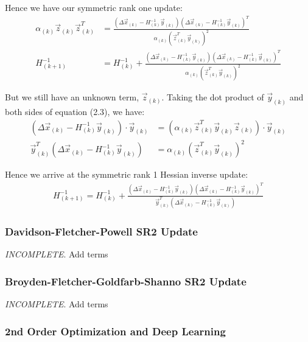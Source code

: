 \documentclass[paper=a4, fontsize=12pt]{scrartcl} %
\numberwithin{equation}{section} %
\numberwithin{figure}{section} %
\numberwithin{table}{section} %
\begin{document}
Hence we have our symmetric rank one update:
\begin{align*}
    \alpha_{(k)} \vec{z}_{(k)} \vec{z}_{(k)}^T &= \frac{\left( \Delta \vec{x}_{(k)} - H_{(k)}^{-1} \vec{y}_{(k)} \right) \left( \Delta \vec{x}_{(k)} - H_{(k)}^{-1} \vec{y}_{(k)} \right)^T}{\alpha_{(k)} (\vec{z}_{(k)}^T \vec{y}_{(k)})^2} \\
    H_{(k+1)}^{-1} &= H_{(k)}^{-1} + \frac{\left( \Delta \vec{x}_{(k)} - H_{(k)}^{-1} \vec{y}_{(k)} \right) \left( \Delta \vec{x}_{(k)} - H_{(k)}^{-1} \vec{y}_{(k)} \right)^T}{\alpha_{(k)} (\vec{z}_{(k)}^T \vec{y}_{(k)})^2}
\end{align*}

But we still have an unknown term, $\vec{z}_{(k)}$. Taking the dot product of $\vec{y}_{(k)}$ and both sides of equation (2.3), we have:
\begin{align*}
    \left( \Delta \vec{x}_{(k)} - H_{(k)}^{-1} \vec{y}_{(k)} \right) \cdot \vec{y}_{(k)} &= \left( \alpha_{(k)} \vec{z}_{(k)}^T \vec{y}_{(k)} \vec{z}_{(k)} \right) \cdot \vec{y}_{(k)} \\
    \vec{y}_{(k)}^T \left( \Delta \vec{x}_{(k)} - H_{(k)}^{-1} \vec{y}_{(k)} \right) &= \alpha_{(k)} \left( \vec{z}_{(k)}^T \vec{y}_{(k)} \right)^2
\end{align*}

Hence we arrive at the symmetric rank 1 Hessian inverse update:
\begin{align*}
    H_{(k+1)}^{-1} = H_{(k)}^{-1} + \frac{\left( \Delta \vec{x}_{(k)} - H_{(k)}^{-1} \vec{y}_{(k)} \right) \left( \Delta \vec{x}_{(k)} - H_{(k)}^{-1} \vec{y}_{(k)} \right)^T}{\vec{y}_{(k)}^T \left( \Delta \vec{x}_{(k)} - H_{(k)}^{-1} \vec{y}_{(k)} \right)}
\end{align*}

\subsubsection{Davidson-Fletcher-Powell SR2 Update}

\textit{INCOMPLETE}. Add terms

\subsubsection{Broyden-Fletcher-Goldfarb-Shanno SR2 Update}

\textit{INCOMPLETE}. Add terms

\subsubsection{2nd Order Optimization and Deep Learning}
\end{document}
